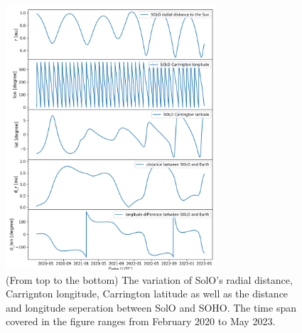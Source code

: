 \begin{figure}
    \centering
    \includegraphics[width = 0.7\textwidth]{images/ACR/SOLO_orbit_helioscentric_3.png}
    \caption[The orbit variation of \ac{SolO} in carrington coordinate system]{(From top to the bottom) The variation of \ac{SolO}'s radial distance, Carrignton longitude, Carrington latitude as well as the distance and longitude seperation between \ac{SolO} and \ac{SOHO}. The time span covered in the figure ranges from February 2020 to May 2023. }
    \label{fig:SOLO_orbit_info}
\end{figure}
